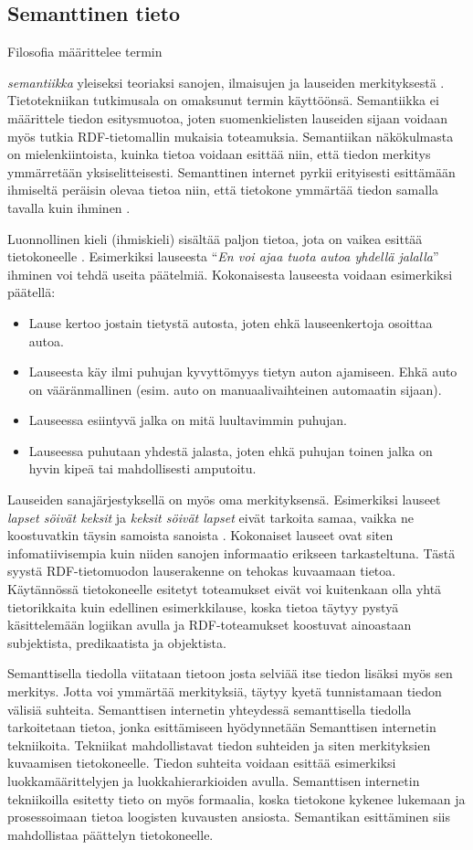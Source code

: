 \documentclass[finnish, 12pt, a4paper, elec, utf8, pdfa, online]{aaltothesis}
\begin{document}
\subsection{Semanttinen tieto}
Filosofia määrittelee termin {\textit{semantiikka} yleiseksi teoriaksi sanojen, ilmaisujen ja lauseiden merkityksestä \cite{semantics_phi}. Tietotekniikan tutkimusala on omaksunut termin käyttöönsä. Semantiikka ei määrittele tiedon esitysmuotoa, joten suomenkielisten lauseiden sijaan voidaan myös tutkia RDF-tietomallin mukaisia toteamuksia. Semantiikan näkökulmasta on mielenkiintoista, kuinka tietoa voidaan esittää niin, että tiedon merkitys ymmärretään yksiselitteisesti. Semanttinen internet pyrkii erityisesti esittämään ihmiseltä peräisin olevaa tietoa niin, että tietokone ymmärtää tiedon samalla tavalla kuin ihminen \cite{Berners_visio}.

Luonnollinen kieli (ihmiskieli) sisältää paljon tietoa, jota on vaikea esittää tietokoneelle \cite{semantics}. Esimerkiksi lauseesta ``\textit{En voi ajaa tuota autoa yhdellä jalalla}'' ihminen voi tehdä useita päätelmiä. Kokonaisesta lauseesta voidaan esimerkiksi päätellä:
\begin{itemize}
  \item  Lause kertoo jostain tietystä autosta, joten ehkä lauseenkertoja osoittaa autoa.
  \item  Lauseesta käy ilmi puhujan kyvyttömyys tietyn auton ajamiseen. Ehkä auto on vääränmallinen (esim. auto on manuaalivaihteinen automaatin sijaan).
  \item  Lauseessa esiintyvä jalka on mitä luultavimmin puhujan.
  \item  Lauseessa puhutaan yhdestä jalasta, joten ehkä puhujan toinen jalka on hyvin kipeä tai mahdollisesti amputoitu.
\end{itemize}
Lauseiden sanajärjestyksellä on myös oma merkityksensä. Esimerkiksi lauseet \textit{lapset söivät keksit} ja \textit{keksit söivät lapset} eivät tarkoita samaa, vaikka ne koostuvatkin täysin samoista sanoista \cite{semantics}. Kokonaiset lauseet ovat siten infomatiivisempia kuin niiden sanojen informaatio erikseen tarkasteltuna. Tästä syystä RDF-tietomuodon lauserakenne on tehokas kuvaamaan tietoa. Käytännössä tietokoneelle esitetyt toteamukset eivät voi kuitenkaan olla yhtä tietorikkaita kuin edellinen esimerkkilause, koska tietoa täytyy pystyä käsittelemään logiikan avulla ja RDF-toteamukset koostuvat ainoastaan subjektista, predikaatista ja objektista.

Semanttisella tiedolla viitataan tietoon josta selviää itse tiedon lisäksi myös sen merkitys. Jotta voi ymmärtää merkityksiä, täytyy kyetä tunnistamaan tiedon välisiä suhteita. Semanttisen internetin yhteydessä semanttisella tiedolla tarkoitetaan tietoa, jonka esittämiseen hyödynnetään Semanttisen internetin tekniikoita. Tekniikat mahdollistavat tiedon suhteiden ja siten merkityksien kuvaamisen tietokoneelle. Tiedon suhteita voidaan esittää esimerkiksi luokkamäärittelyjen ja luokkahierarkioiden avulla. Semanttisen internetin tekniikoilla esitetty tieto on myös formaalia, koska tietokone kykenee lukemaan ja prosessoimaan tietoa loogisten kuvausten ansiosta. Semantikan esittäminen siis mahdollistaa päättelyn tietokoneelle.


}
\end{document}
